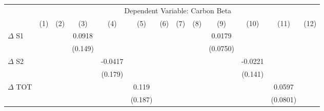 {
\def\sym#1{\ifmmode^{#1}\else\(^{#1}\)\fi}
\begin{tabular}{l*{12}{c}}
\hline\hline
                    &\multicolumn{12}{c}{Dependent Variable: Carbon Beta}                                                                                                                                                                                                                   \\\cmidrule(lr){2-13}
                    &\multicolumn{1}{c}{(1)}         &\multicolumn{1}{c}{(2)}         &\multicolumn{1}{c}{(3)}         &\multicolumn{1}{c}{(4)}         &\multicolumn{1}{c}{(5)}         &\multicolumn{1}{c}{(6)}         &\multicolumn{1}{c}{(7)}         &\multicolumn{1}{c}{(8)}         &\multicolumn{1}{c}{(9)}         &\multicolumn{1}{c}{(10)}         &\multicolumn{1}{c}{(11)}         &\multicolumn{1}{c}{(12)}         \\
\hline
$\Delta$ S1         &                     &                     &      0.0918         &                     &                     &                     &                     &                     &      0.0179         &                     &                     &                     \\
                    &                     &                     &     (0.149)         &                     &                     &                     &                     &                     &    (0.0750)         &                     &                     &                     \\
$\Delta$ S2         &                     &                     &                     &     -0.0417         &                     &                     &                     &                     &                     &     -0.0221         &                     &                     \\
                    &                     &                     &                     &     (0.179)         &                     &                     &                     &                     &                     &     (0.141)         &                     &                     \\
$\Delta$ TOT        &                     &                     &                     &                     &       0.119         &                     &                     &                     &                     &                     &      0.0597         &                     \\
                    &                     &                     &                     &                     &     (0.187)         &                     &                     &                     &                     &                     &    (0.0801)         &                     \\

\end{tabular}}
